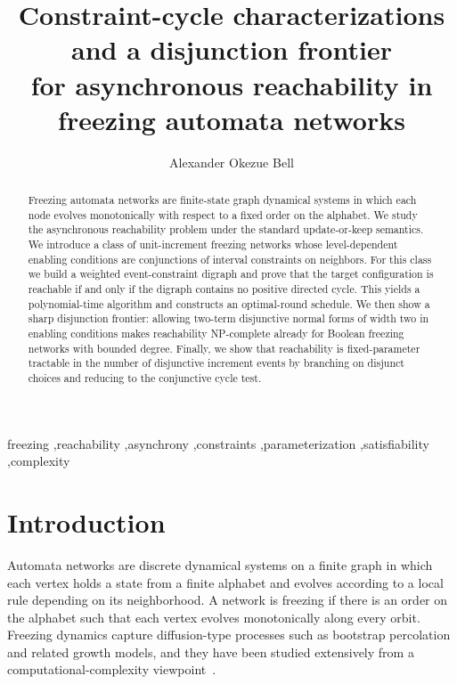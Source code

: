 \documentclass[final,3p,times]{elsarticle}
\theoremstyle{definition}
\theoremstyle{remark}
\begin{document}
\begin{frontmatter}

\title{Constraint-cycle characterizations and a disjunction frontier\\
for asynchronous reachability in freezing automata networks}

\author[inst1]{Alexander Okezue Bell}
\address[inst1]{Department of Mathematics, Stanford University, Stanford, CA, US}

\begin{abstract}
Freezing automata networks are finite-state graph dynamical systems in which each node evolves monotonically with respect to a fixed order on the alphabet.
We study the asynchronous reachability problem under the standard update-or-keep semantics.
We introduce a class of unit-increment freezing networks whose level-dependent enabling conditions are conjunctions of interval constraints on neighbors.
For this class we build a weighted event-constraint digraph and prove that the target configuration is reachable if and only if the digraph contains no positive directed cycle.
This yields a polynomial-time algorithm and constructs an optimal-round schedule.
We then show a sharp disjunction frontier: allowing two-term disjunctive normal forms of width two in enabling conditions makes reachability NP-complete already for Boolean freezing networks with bounded degree.
Finally, we show that reachability is fixed-parameter tractable in the number of disjunctive increment events by branching on disjunct choices and reducing to the conjunctive cycle test.
\end{abstract}

\begin{keyword}
freezing \sep reachability \sep asynchrony \sep constraints \sep parameterization \sep satisfiability \sep complexity
\end{keyword}

\end{frontmatter}

\section{Introduction}

Automata networks are discrete dynamical systems on a finite graph in which each vertex holds a state from a finite alphabet and evolves according to a local rule depending on its neighborhood.
A network is freezing if there is an order on the alphabet such that each vertex evolves monotonically along every orbit.
Freezing dynamics capture diffusion-type processes such as bootstrap percolation and related growth models, and they have been studied extensively from a computational-complexity viewpoint~\cite{goles2024parameterized}.
\end{document}
